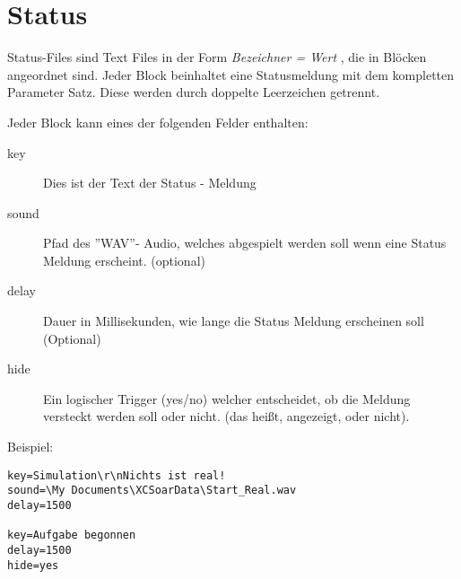 \section{Status}\label{sec:status}
Status-Files sind Text Files in der Form  {\em Bezeichner  = Wert },
die in Blöcken  angeordnet sind. Jeder Block beinhaltet eine Statusmeldung
mit dem kompletten Parameter Satz.
Diese werden durch doppelte Leerzeichen getrennt.

Jeder Block kann eines der folgenden Felder enthalten:

\begin{description}
\item[key]  Dies ist der Text der Status - Meldung
\item[sound]  Pfad des ''\textsf{WAV}''- Audio, welches abgespielt werden soll
wenn eine Status Meldung erscheint. (optional)
\item[delay] Dauer in Millisekunden, wie lange die Status Meldung erscheinen soll (Optional)
\item[hide] Ein logischer Trigger (yes/no) welcher entscheidet, ob die Meldung
versteckt werden soll oder nicht. (das heißt, angezeigt, oder nicht).
\end{description}

Beispiel:
\begin{verbatim}
key=Simulation\r\nNichts ist real!
sound=\My Documents\XCSoarData\Start_Real.wav
delay=1500

key=Aufgabe begonnen
delay=1500
hide=yes
\end{verbatim}
%
